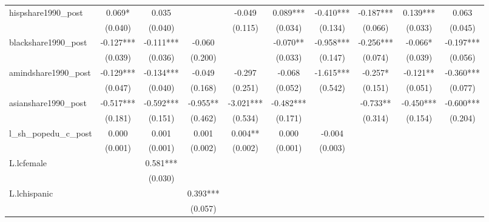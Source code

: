 \begin{table}[htbp]
\begin{tabular}{l*{9}{c}}
\addlinespace
hispshare1990\_post  &    0.069*  &    0.035   &            &   -0.049   &    0.089***&   -0.410***&   -0.187***&    0.139***&    0.063   \\
                    &  (0.040)   &  (0.040)   &            &  (0.115)   &  (0.034)   &  (0.134)   &  (0.066)   &  (0.033)   &  (0.045)   \\
\addlinespace
blackshare1990\_post &   -0.127***&   -0.111***&   -0.060   &            &   -0.070** &   -0.958***&   -0.256***&   -0.066*  &   -0.197***\\
                    &  (0.039)   &  (0.036)   &  (0.200)   &            &  (0.033)   &  (0.147)   &  (0.074)   &  (0.039)   &  (0.056)   \\
\addlinespace
amindshare1990\_post &   -0.129***&   -0.134***&   -0.049   &   -0.297   &   -0.068   &   -1.615***&   -0.257*  &   -0.121** &   -0.360***\\
                    &  (0.047)   &  (0.040)   &  (0.168)   &  (0.251)   &  (0.052)   &  (0.542)   &  (0.151)   &  (0.051)   &  (0.077)   \\
\addlinespace
asianshare1990\_post &   -0.517***&   -0.592***&   -0.955** &   -3.021***&   -0.482***&            &   -0.733** &   -0.450***&   -0.600***\\
                    &  (0.181)   &  (0.151)   &  (0.462)   &  (0.534)   &  (0.171)   &            &  (0.314)   &  (0.154)   &  (0.204)   \\
\addlinespace
l\_sh\_popedu\_c\_post  &    0.000   &    0.001   &    0.001   &    0.004** &    0.000   &   -0.004   &            &            &            \\
                    &  (0.001)   &  (0.001)   &  (0.002)   &  (0.002)   &  (0.001)   &  (0.003)   &            &            &            \\
\addlinespace
L.lcfemale          &            &    0.581***&            &            &            &            &            &            &            \\
                    &            &  (0.030)   &            &            &            &            &            &            &            \\
\addlinespace
L.lchispanic        &            &            &    0.393***&            &            &            &            &            &            \\
                    &            &            &  (0.057)   &            &            &            &            &            &            \\

\end{tabular}
\end{table}
